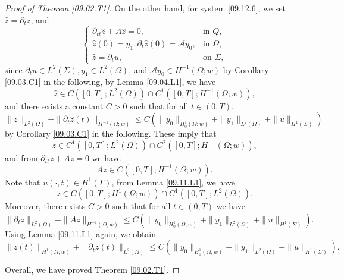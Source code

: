 \documentclass[preprint,12pt]{elsarticle}
\theoremstyle{definition}   %
\numberwithin{equation}{section}
\def\pt{\partial}
\def\pt{\partial}
\def\Om{\Omega}
\def\Ga{\Gamma}
\def\wh{\widehat}
\def\mcA{\mathcal{A}}
\begin{document}
\begin{proof}[Proof of Theorem \ref{09.02.T1}]
	On the other hand, for system \eqref{09.12.6}, we set $\wh z=\pt_tz$, and 
	\begin{equation*}
		\begin{cases}
			\pt_{tt}\wh z+A \wh z=0, &\mbox{in }Q, \\
			\wh z(0)=y_1, \pt_t\wh z(0)=\mcA y_0, &\mbox{in } \Om,\\
			\wh z=\pt_t u, &\mbox{on }\Sigma, 
		\end{cases}
	\end{equation*}
	since $\pt_tu\in L^2(\Sigma), y_1\in L^2(\Om)$, and $\mcA y_0\in H^{-1}(\Om;w)$ by Corollary \ref{09.03.C1} in the following, by Lemma \ref{09.04.L1}, we have 
	\begin{equation*}
		\wh z\in C([0,T]; L^2(\Om))\cap C^1([0,T]; H^{-1}(\Om;w)), 
	\end{equation*}
	and there exists a constant $C>0$ such that for all $t\in (0,T)$, 
	\begin{equation*}
		\|\wh z\|_{L^2(\Om)}+\|\pt_t\wh z(t)\|_{H^{-1}(\Om;w)}\leq C\left(\|y_0\|_{H_0^1(\Om;w)}+\|y_1\|_{L^2(\Om)}+\|u\|_{H^1(\Sigma)}\right)
	\end{equation*}
	by Corollary \ref{09.03.C1} in the following. 
	These imply that 
	\begin{equation*}
		z\in C^1([0,T]; L^2(\Om))\cap C^2([0,T]; H^{-1}(\Om;w)), 
	\end{equation*}
	and from $\pt_{tt}z+A z=0$ we have 
	\begin{equation*}
		Az\in C([0,T]; H^{-1}(\Om;w)). 
	\end{equation*}
	Note that $u(\cdot, t)\in H^1(\Ga)$, from Lemma \ref{09.11.L1}, we have 
	\begin{equation*}
		z\in C([0,T]; H^1(\Om;w))\cap C^1([0,T]; L^2(\Om)). 
	\end{equation*}
	Moreover, there exists $C>0$ such that for all $t\in (0,T)$ we have 
	\begin{equation*}
		\|\pt_tz\|_{L^2(\Om)}+\|Az\|_{H^{-1}(\Om;w)}\leq C\left(\|y_0\|_{H_0^1(\Om;w)}+\|y_1\|_{L^2(\Om)}+\|u\|_{H^1(\Sigma)}\right). 
	\end{equation*}
	Using Lemma \ref{09.11.L1} again, we obtain 
	\begin{equation*}
		\|z(t)\|_{H^1(\Om;w)}+\|\pt_t z(t)\|_{L^2(\Om)}\leq C\left(\|y_0\|_{H_0^1(\Om;w)}+\|y_1\|_{L^2(\Om)}+\|u\|_{H^1(\Sigma)}\right). 
	\end{equation*}
	
	Overall, we have proved Theorem \ref{09.02.T1}. 
\end{proof}
\end{document}
